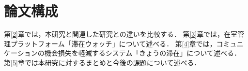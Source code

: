 \section{論文構成}\label{1.3}
第\ref{2}章では，本研究と関連した研究との違いを比較する．
第\ref{3}章では，在室管理プラットフォーム「滞在ウォッチ」について述べる．
第\ref{4}章では，コミュニケーションの機会損失を軽減するシステム「きょうの滞在」について述べる．
第\ref{5}章では本研究に対するまとめと今後の課題について述べる．
\thispagestyle{myheadings}

